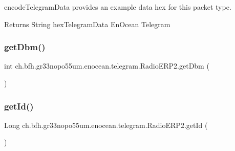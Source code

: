 encode\+Telegram\+Data provides an example data hex for this packet type.

\begin{DoxyReturn}{Returns}
String hex\+Telegram\+Data En\+Ocean Telegram 
\end{DoxyReturn}
\hypertarget{classch_1_1bfh_1_1gr33nopo55um_1_1enocean_1_1telegram_1_1_radio_e_r_p2_a4ada4794d8f5e61062207c15189e3917}{}\label{classch_1_1bfh_1_1gr33nopo55um_1_1enocean_1_1telegram_1_1_radio_e_r_p2_a4ada4794d8f5e61062207c15189e3917} 
\subsubsection{\texorpdfstring{get\+Dbm()}{getDbm()}}
{\footnotesize\ttfamily int ch.\+bfh.\+gr33nopo55um.\+enocean.\+telegram.\+Radio\+E\+R\+P2.\+get\+Dbm (\begin{DoxyParamCaption}{ }\end{DoxyParamCaption})}

\hypertarget{classch_1_1bfh_1_1gr33nopo55um_1_1enocean_1_1telegram_1_1_radio_e_r_p2_a3061b5400e16856a535752e4d17cc524}{}\label{classch_1_1bfh_1_1gr33nopo55um_1_1enocean_1_1telegram_1_1_radio_e_r_p2_a3061b5400e16856a535752e4d17cc524} 
\subsubsection{\texorpdfstring{get\+Id()}{getId()}}
{\footnotesize\ttfamily Long ch.\+bfh.\+gr33nopo55um.\+enocean.\+telegram.\+Radio\+E\+R\+P2.\+get\+Id (\begin{DoxyParamCaption}{ }\end{DoxyParamCaption})}

\hypertarget{classch_1_1bfh_1_1gr33nopo55um_1_1enocean_1_1telegram_1_1_radio_e_r_p2_a685f21c7294670a8658dda11ae966009}{}\label{classch_1_1bfh_1_1gr33nopo55um_1_1enocean_1_1telegram_1_1_radio_e_r_p2_a685f21c7294670a8658dda11ae966009} 
